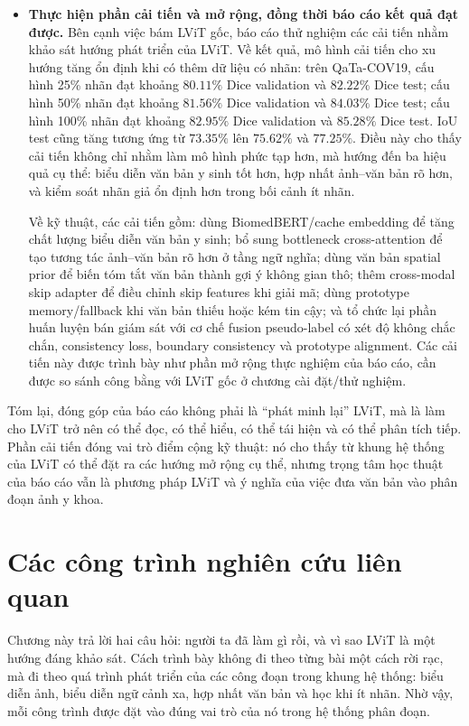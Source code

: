 \begin{itemize}
  \item \textbf{Thực hiện phần cải tiến và mở rộng, đồng thời báo cáo kết quả đạt được.} Bên cạnh việc bám LViT gốc, báo cáo thử nghiệm các cải tiến nhằm khảo sát hướng phát triển của LViT. Về kết quả, mô hình cải tiến cho xu hướng tăng ổn định khi có thêm dữ liệu có nhãn: trên QaTa-COV19, cấu hình 25\% nhãn đạt khoảng \(80.11\%\) Dice validation và \(82.22\%\) Dice test; cấu hình 50\% nhãn đạt khoảng \(81.56\%\) Dice validation và \(84.03\%\) Dice test; cấu hình 100\% nhãn đạt khoảng \(82.95\%\) Dice validation và \(85.28\%\) Dice test. IoU test cũng tăng tương ứng từ \(73.35\%\) lên \(75.62\%\) và \(77.25\%\). Điều này cho thấy cải tiến không chỉ nhằm làm mô hình phức tạp hơn, mà hướng đến ba hiệu quả cụ thể: biểu diễn văn bản y sinh tốt hơn, hợp nhất ảnh--văn bản rõ hơn, và kiểm soát nhãn giả ổn định hơn trong bối cảnh ít nhãn.

  Về kỹ thuật, các cải tiến gồm: dùng BiomedBERT/cache embedding để tăng chất lượng biểu diễn văn bản y sinh; bổ sung bottleneck cross-attention để tạo tương tác ảnh--văn bản rõ hơn ở tầng ngữ nghĩa; dùng văn bản spatial prior để biến tóm tắt văn bản thành gợi ý không gian thô; thêm cross-modal skip adapter để điều chỉnh skip features khi giải mã; dùng prototype memory/fallback khi văn bản thiếu hoặc kém tin cậy; và tổ chức lại phần huấn luyện bán giám sát với cơ chế fusion pseudo-label có xét độ không chắc chắn, consistency loss, boundary consistency và prototype alignment. Các cải tiến này được trình bày như phần mở rộng thực nghiệm của báo cáo, cần được so sánh công bằng với LViT gốc ở chương cài đặt/thử nghiệm.
\end{itemize}

Tóm lại, đóng góp của báo cáo không phải là ``phát minh lại'' LViT, mà là làm cho LViT trở nên có thể đọc, có thể hiểu, có thể tái hiện và có thể phân tích tiếp. Phần cải tiến đóng vai trò điểm cộng kỹ thuật: nó cho thấy từ khung hệ thống của LViT có thể đặt ra các hướng mở rộng cụ thể, nhưng trọng tâm học thuật của báo cáo vẫn là phương pháp LViT và ý nghĩa của việc đưa văn bản vào phân đoạn ảnh y khoa.

\chapter{Các công trình nghiên cứu liên quan}
\label{sec:related}

Chương này trả lời hai câu hỏi: người ta đã làm gì rồi, và vì sao LViT là một hướng đáng khảo sát. Cách trình bày không đi theo từng bài một cách rời rạc, mà đi theo quá trình phát triển của các công đoạn trong khung hệ thống: biểu diễn ảnh, biểu diễn ngữ cảnh xa, hợp nhất văn bản và học khi ít nhãn. Nhờ vậy, mỗi công trình được đặt vào đúng vai trò của nó trong hệ thống phân đoạn.


